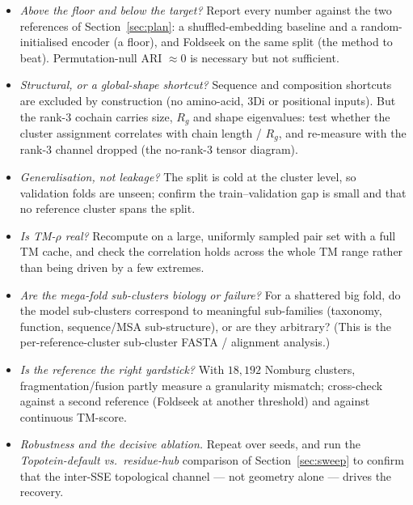 \documentclass[11pt,a4paper]{article}
\theoremstyle{definition}
\begin{document}
\begin{itemize}[leftmargin=1.4em,itemsep=1pt]
\item \emph{Above the floor and below the target?} Report every number against the
      two references of Section~\ref{sec:plan}: a shuffled-embedding baseline and a
      random-initialised encoder (a floor), and Foldseek on the same split (the
      method to beat). Permutation-null ARI $\approx 0$ is necessary but not
      sufficient.
\item \emph{Structural, or a global-shape shortcut?} Sequence and composition
      shortcuts are excluded by construction (no amino-acid, 3Di or positional
      inputs). But the rank-3 cochain carries size, $R_g$ and shape eigenvalues:
      test whether the cluster assignment correlates with chain length / $R_g$, and
      re-measure with the rank-3 channel dropped (the no-rank-3 tensor diagram).
\item \emph{Generalisation, not leakage?} The split is cold at the cluster level, so
      validation folds are unseen; confirm the train--validation gap is small and
      that no reference cluster spans the split.
\item \emph{Is TM-$\rho$ real?} Recompute on a large, uniformly sampled pair set with
      a full TM cache, and check the correlation holds across the whole TM range
      rather than being driven by a few extremes.
\item \emph{Are the mega-fold sub-clusters biology or failure?} For a shattered big
      fold, do the model sub-clusters correspond to meaningful sub-families
      (taxonomy, function, sequence/MSA sub-structure), or are they arbitrary? (This
      is the per-reference-cluster sub-cluster FASTA / alignment analysis.)
\item \emph{Is the reference the right yardstick?} With $18{,}192$ Nomburg clusters,
      fragmentation/fusion partly measure a granularity mismatch; cross-check against
      a second reference (Foldseek at another threshold) and against continuous
      TM-score.
\item \emph{Robustness and the decisive ablation.} Repeat over seeds, and run the
      \emph{Topotein-default vs.\ residue-hub} comparison of Section~\ref{sec:sweep}
      to confirm that the inter-SSE topological channel --- not geometry alone ---
      drives the recovery.
\end{itemize}
\end{document}
